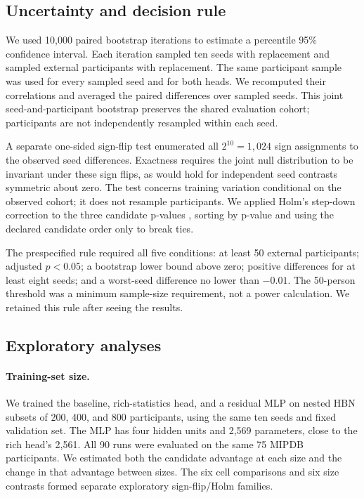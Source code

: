 \subsection{Uncertainty and decision rule}
We used 10,000 paired bootstrap iterations to estimate a percentile 95\%
confidence interval. Each iteration sampled ten seeds with replacement and
sampled external participants with replacement. The same participant sample
was used for every sampled seed and for both heads. We recomputed their
correlations and averaged the paired differences over sampled seeds. This
joint seed-and-participant bootstrap preserves the shared evaluation cohort;
participants are not independently resampled within each seed.

A separate one-sided sign-flip test enumerated all $2^{10}=1{,}024$ sign
assignments to the observed seed differences. Exactness requires the joint
null distribution to be invariant under these sign flips, as would hold for
independent seed contrasts symmetric about zero. The test concerns training
variation conditional on the observed cohort; it does not resample participants.
We applied Holm's step-down correction to the three candidate p-values
\citep{holm1979simple}, sorting by p-value and using the declared candidate
order only to break ties.

The prespecified rule required all five conditions: at least 50 external
participants; adjusted $p<0.05$; a bootstrap lower bound above zero; positive
differences for at least eight seeds; and a worst-seed difference no lower than
$-0.01$. The 50-person threshold was a minimum sample-size requirement, not a
power calculation. We retained this rule after seeing the results.

\subsection{Exploratory analyses}
\paragraph{Training-set size.}
We trained the baseline, rich-statistics head, and a residual MLP on nested HBN
subsets of 200, 400, and 800 participants, using the same ten seeds and fixed
validation set. The MLP has four hidden units and 2,569 parameters, close to
the rich head's 2,561. All 90 runs were evaluated on the same 75 MIPDB
participants. We estimated both the candidate advantage at each size and the
change in that advantage between sizes. The six cell comparisons and six
size contrasts formed separate exploratory sign-flip/Holm families.


